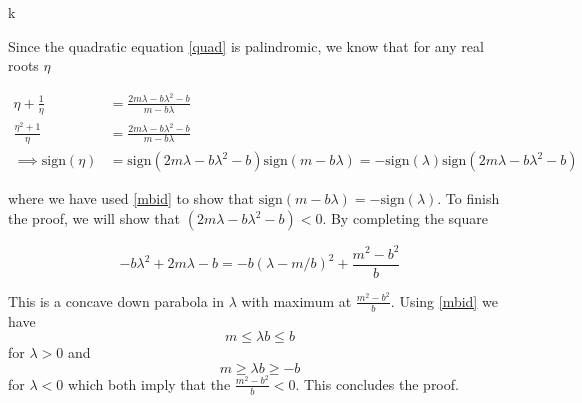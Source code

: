 k\documentclass{article}
\begin{document}
Since the quadratic equation \eqref{quad} is palindromic, we know that for any real roots $\eta$

\begin{align}
    \eta + \frac{1}{\eta} &= \frac{2m\lambda - b\lambda^2-b}{m-b\lambda} \\
    \frac{\eta^2 + 1}{\eta} &= \frac{2m\lambda - b\lambda^2-b}{m-b\lambda} \\
    \implies \text{sign}(\eta) &= \text{sign}(2m\lambda - b\lambda^2-b)\text{sign}(m-b\lambda) = -\text{sign}(\lambda)\text{sign}(2m\lambda - b\lambda^2-b)
\end{align}

where we have used \eqref{mbid} to show that $\text{sign}(m-b\lambda)= - \text{sign}(\lambda)$. To finish the proof, we will show that $(2m\lambda - b\lambda^2-b) < 0$. By completing the square

\begin{equation}
    -b\lambda^2 + 2m\lambda -b = -b(\lambda - m/b)^2 + \frac{m^2 - b^2}{b}
\end{equation}

This is a concave down parabola in $\lambda$ with maximum at $\frac{m^2 - b^2}{b}$. Using \eqref{mbid} we have 
\begin{equation}
    m \le \lambda b \le b
\end{equation}
for $\lambda > 0$ and 
\begin{equation}
    m \ge \lambda b \ge -b
\end{equation}
for $\lambda <0$ which both imply that the $\frac{m^2 - b^2}{b}<0$. This concludes the proof. 
\end{document}
